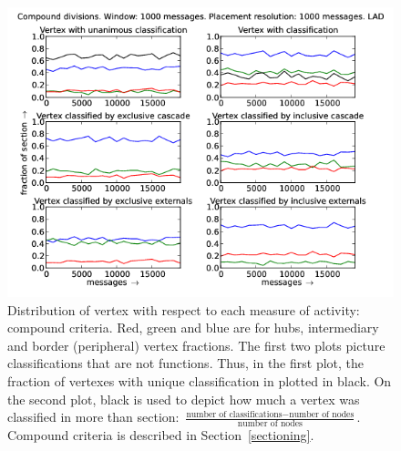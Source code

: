\documentclass[%
 aip,
 jmp,%
 amsmath,amssymb,
 reprint,%
]{revtex4-1}
\begin{document}
\begin{figure}[hbtp] 
   \centering
        \includegraphics[width=\textwidth]{figs/LAD/1000_2}
    \caption{Distribution of vertex with respect to each measure of activity: compound criteria. Red, green and blue are for hubs, intermediary and border (peripheral) vertex fractions. The first two plots picture classifications that are not functions. Thus, in the first plot, the fraction of vertexes with unique classification in plotted in black. On the second plot, black is used to depict how much a vertex was classified in more than section: $\frac{\text{number of classifications} - \text{number of nodes}}{\text{number of nodes}}$. Compound criteria is described in Section~\ref{sectioning}.}
    \label{fig:lad1000_}
\end{figure}
\end{document}
